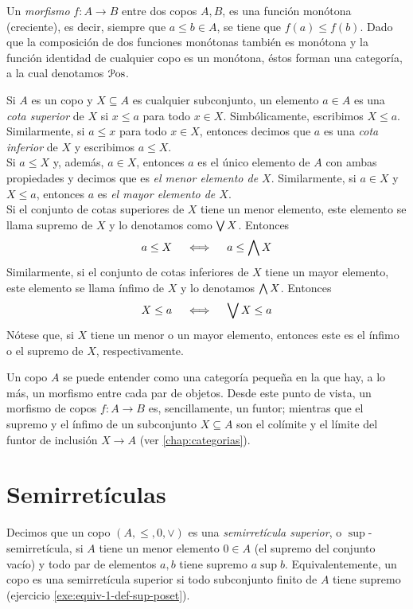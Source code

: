 Un \emph{morfismo} $f\colon A\rightarrow B$ entre dos copos $A,B$, es una función
monótona (creciente), es decir, siempre que $a\leq b\in A$, se tiene
que $f(a)\leq f(b)$.
Dado que la composición de dos funciones monótonas también es
monótona y la función identidad de cualquier copo es un monótona,
éstos forman una categoría, a la cual denotamos $\mathcal{P}\mathrm{os}$.

Si $A$ es un copo y $X\subseteq A$ es cualquier subconjunto,
un elemento $a\in A$ es una \emph{ cota superior } de $X$
si $x\leq a$ para todo $x\in X$. Simbólicamente, escribimos $X\leq a$.
Similarmente, si $a\leq x$ para todo $x\in X$, entonces decimos
que $a$ es una \emph{ cota inferior } de $X$ y escribimos $a\leq X$.
\\
Si $a\leq X$ y, además, $a\in X$, entonces $a$ es el único elemento de
$A$ con ambas propiedades y decimos que es \emph{el menor elemento de
$X$}. Similarmente, si $a\in X$ y $X\leq a$, entonces $a$ es \emph{el mayor
elemento de $X$}. \\
Si el conjunto de cotas superiores de $X$ tiene un menor
elemento, este elemento se llama supremo de $X$ y lo denotamos
como $\bigvee X$.  Entonces
\begin{equation}
  a\leq X \quad\iff\quad a\leq \bigwedge X
\end{equation}
Similarmente, si el conjunto de cotas inferiores de $X$ tiene un
mayor elemento, este elemento se llama ínfimo de $X$ y lo
denotamos $\bigwedge X$. Entonces
\begin{equation}
  X\leq a \quad\iff\quad \bigvee X\leq a
\end{equation}
Nótese que, si $X$ tiene un menor o un mayor elemento, entonces este
es el ínfimo o el supremo de $X$, respectivamente.

\begin{remark}\label{obs1}
  Un copo $A$ se puede entender como una categoría pequeña en la que
  hay, a lo más, un morfismo entre cada par de objetos.
  Desde este punto de vista, un morfismo de copos $f:A\to B$ es,
  sencillamente, un funtor; mientras que el supremo y el ínfimo de un
  subconjunto $X\subseteq A$ son el colímite y el límite del funtor
  de inclusión $X\to A$ (ver  \ref{chap:categorias}).
\end{remark}

\section{Semirretículas}
\label{ss:semirreticulas}
Decimos que un copo $(A,\leq, 0, \vee)$ es una \emph{semirretícula superior},
o $\sup$-semirretícula, si $A$ tiene un menor elemento $0\in A$ (el
supremo del conjunto vacío) y todo par
de elementos $a,b$ tiene supremo $a\sup b$.
Equivalentemente, un copo es una semirretícula superior si
todo subconjunto finito de $A$ tiene supremo (ejercicio
\ref{exe:equiv-1-def-sup-poset}).

